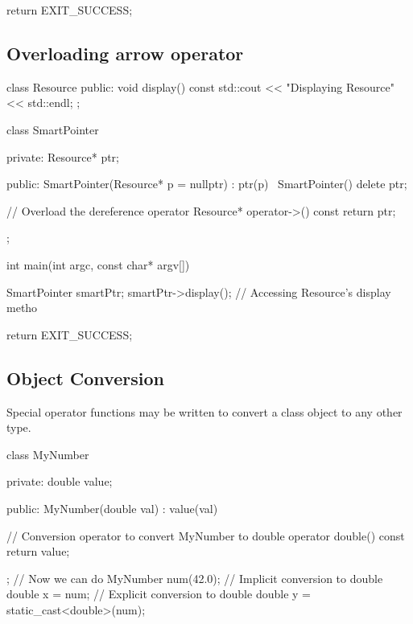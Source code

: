 \documentclass{report}
\begin{document}
\begin{concept}
\begin{cppcode}
{    return EXIT_SUCCESS;
}
    \end{cppcode}
    \pagebreak 
    \subsection{Overloading arrow operator}
    \bigbreak \noindent 
    \begin{cppcode}
class Resource {
public:
    void display() const { std::cout << "Displaying Resource" << std::endl; }
};

class SmartPointer {
private:
    Resource* ptr;

public:
    SmartPointer(Resource* p = nullptr) : ptr(p) {}
    ~SmartPointer() { delete ptr; }

    // Overload the dereference operator
    Resource* operator->() const { return ptr; }
};

int main(int argc, const char* argv[]) {
     SmartPointer smartPtr;
    smartPtr->display();  // Accessing Resource's display metho
    
    return EXIT_SUCCESS;
}
    \end{cppcode}

    \pagebreak 
    \subsection{Object Conversion}
    \bigbreak \noindent 
    \begin{concept}
        Special operator functions may be written to convert a class object to any other type.
    \end{concept}
    \bigbreak \noindent 
    \begin{cppcode}
        class MyNumber {
        private:
            double value;

        public:
            MyNumber(double val) : value(val) {}

            // Conversion operator to convert MyNumber to double
            operator double() const {
                return value;
            }
        };
        // Now we can do
        MyNumber num(42.0);
        // Implicit conversion to double
        double x = num;
        // Explicit conversion to double
        double y = static_cast<double>(num);
    \end{cppcode}

    \bigbreak \noindent 

\end{concept}
\end{document}

